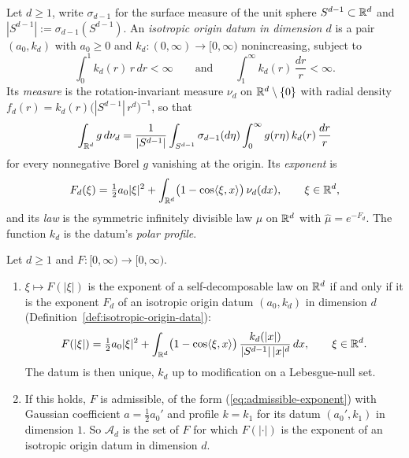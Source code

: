 \begin{definition}
\label{def:isotropic-origin-data}

Let $d \ge 1$, write $\sigma_{d-1}$ for the surface measure of the unit sphere
$S^{d-1} \subset \mathbb{R}^d$ and $|S^{d-1}| := \sigma_{d-1}(S^{d-1})$. An \emph{isotropic origin datum
in dimension $d$} is a pair $(a_0, k_d)$ with $a_0 \ge 0$ and $k_d : (0,\infty) \to [0,\infty)$
nonincreasing, subject to
\[
  \int_0^1 k_d(r)\,r\,dr < \infty \qquad\text{and}\qquad \int_1^\infty k_d(r)\,\frac{dr}{r} < \infty .
\]
Its \emph{\Levy{} measure} is the rotation-invariant measure $\nu_d$ on $\mathbb{R}^d \setminus \{0\}$
with radial density $f_d(r) = k_d(r)\bigl(|S^{d-1}|\,r^d\bigr)^{-1}$, so that
\[
  \int_{\mathbb{R}^d} g\,d\nu_d = \frac{1}{|S^{d-1}|}\int_{S^{d-1}}\sigma_{d-1}(d\eta)
  \int_0^\infty g(r\eta)\,k_d(r)\,\frac{dr}{r}
\]
for every nonnegative Borel $g$ vanishing at the origin. Its \emph{exponent} is
\[
  F_d(\xi) = \tfrac12 a_0|\xi|^2 + \int_{\mathbb{R}^d}\bigl(1 - \cos\langle\xi, x\rangle\bigr)\,\nu_d(dx),
  \qquad \xi \in \mathbb{R}^d,
\]
and its \emph{law} is the symmetric infinitely divisible law $\mu$ on $\mathbb{R}^d$ with
$\widehat\mu = e^{-F_d}$. The function $k_d$ is the datum's \emph{polar profile}.
\end{definition}

\begin{theorem}
\label{thm:cited-A35}

Let $d \ge 1$ and $F : [0,\infty) \to [0,\infty)$.
\begin{enumerate}
\item $\xi \mapsto F(|\xi|)$ is the exponent of a self-decomposable law on $\mathbb{R}^d$ if and only if
it is the exponent $F_d$ of an isotropic origin datum $(a_0, k_d)$ in dimension $d$
(Definition~\ref{def:isotropic-origin-data}):
\[
  F(|\xi|) = \tfrac12 a_0|\xi|^2 + \int_{\mathbb{R}^d}\bigl(1 - \cos\langle\xi, x\rangle\bigr)\,
  \frac{k_d(|x|)}{|S^{d-1}|\,|x|^d}\,dx, \qquad \xi \in \mathbb{R}^d.
\]
The datum is then unique, $k_d$ up to modification on a Lebesgue-null set.
\item If this holds, $F$ is admissible, of the form (\ref{eq:admissible-exponent}) with Gaussian
coefficient $a = \tfrac12 a_0'$ and profile $k = k_1$ for its datum $(a_0', k_1)$ in dimension $1$. So
$\mathcal{A}_d$ is the set of $F$ for which $F(|\cdot|)$ is the exponent of an isotropic origin
datum in dimension $d$.
\end{enumerate}
\end{theorem}

